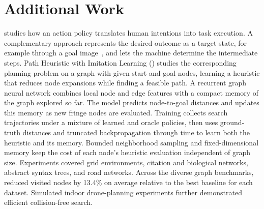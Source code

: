 \FloatBarrier
\section{Additional Work}
\label{sec:dysta-additional-work}

\dysta{} studies how an action policy translates human intentions into task execution. A complementary approach represents the desired outcome as a target state, for example through a goal image~\citep{assran2025vjepa2,murlabadia2026vjepa21}, and lets the machine determine the intermediate steps. Path Heuristic with Imitation Learning (\phil{}) studies the corresponding planning problem on a graph with given start and goal nodes, learning a heuristic that reduces node expansions while finding a feasible path. A recurrent graph neural network combines local node and edge features with a compact memory of the graph explored so far. The model predicts node-to-goal distances and updates this memory as new fringe nodes are evaluated. Training collects search trajectories under a mixture of learned and oracle policies, then uses ground-truth distances and truncated backpropagation through time to learn both the heuristic and its memory. Bounded neighborhood sampling and fixed-dimensional memory keep the cost of each node's heuristic evaluation independent of graph size. Experiments covered grid environments, citation and biological networks, abstract syntax trees, and road networks. Across the diverse graph benchmarks, \phil{} reduced visited nodes by 13.4\% on average relative to the best baseline for each dataset. Simulated indoor drone-planning experiments further demonstrated efficient collision-free search.
